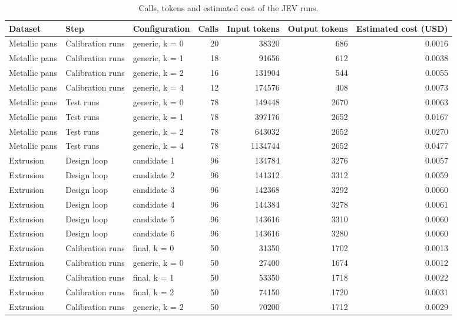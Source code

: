 \begin{table}

\caption{\label{tab:tbl-cost}Calls, tokens and estimated cost of the JEV runs.}
\centering
\begin{tabular}[t]{lllrrrr}
\toprule
Dataset & Step & Configuration & Calls & Input tokens & Output tokens & Estimated cost (USD)\\
\midrule
Metallic pans & Calibration runs & generic, k = 0 & 20 & 38320 & 686 & 0.0016\\
Metallic pans & Calibration runs & generic, k = 1 & 18 & 91656 & 612 & 0.0038\\
Metallic pans & Calibration runs & generic, k = 2 & 16 & 131904 & 544 & 0.0055\\
Metallic pans & Calibration runs & generic, k = 4 & 12 & 174576 & 408 & 0.0073\\
Metallic pans & Test runs & generic, k = 0 & 78 & 149448 & 2670 & 0.0063\\
\addlinespace
Metallic pans & Test runs & generic, k = 1 & 78 & 397176 & 2652 & 0.0167\\
Metallic pans & Test runs & generic, k = 2 & 78 & 643032 & 2652 & 0.0270\\
Metallic pans & Test runs & generic, k = 4 & 78 & 1134744 & 2652 & 0.0477\\
Extrusion & Design loop & candidate 1 & 96 & 134784 & 3276 & 0.0057\\
Extrusion & Design loop & candidate 2 & 96 & 141312 & 3312 & 0.0059\\
\addlinespace
Extrusion & Design loop & candidate 3 & 96 & 142368 & 3292 & 0.0060\\
Extrusion & Design loop & candidate 4 & 96 & 144384 & 3278 & 0.0061\\
Extrusion & Design loop & candidate 5 & 96 & 143616 & 3310 & 0.0060\\
Extrusion & Design loop & candidate 6 & 96 & 143616 & 3280 & 0.0060\\
Extrusion & Calibration runs & final, k = 0 & 50 & 31350 & 1702 & 0.0013\\
\addlinespace
Extrusion & Calibration runs & generic, k = 0 & 50 & 27400 & 1674 & 0.0012\\
Extrusion & Calibration runs & final, k = 1 & 50 & 53350 & 1718 & 0.0022\\
Extrusion & Calibration runs & final, k = 2 & 50 & 74150 & 1720 & 0.0031\\
Extrusion & Calibration runs & generic, k = 2 & 50 & 70200 & 1712 & 0.0029\\

\end{tabular}
\end{table}
